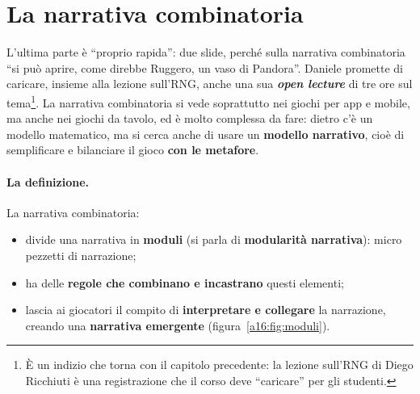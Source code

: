 \section{La narrativa combinatoria}
\label{a16:sec:combinatoria}



L'ultima parte è ``proprio rapida'': due slide, perché sulla narrativa combinatoria ``si può aprire,
come direbbe Ruggero, un vaso di Pandora''. Daniele promette di caricare, insieme alla lezione
sull'RNG, anche una sua \textbf{\emph{open lecture}} di tre ore sul tema\footnote{È un indizio che
torna con il capitolo precedente: la lezione sull'RNG di Diego Ricchiuti è una registrazione che il
corso deve ``caricare'' per gli studenti.}. La narrativa combinatoria si vede soprattutto nei giochi
per app e mobile, ma anche nei giochi da tavolo, ed è molto complessa da fare: dietro c'è un modello
matematico, ma si cerca anche di usare un \textbf{modello narrativo}, cioè di semplificare e
bilanciare il gioco \textbf{con le metafore}.

\paragraph{La definizione.} La narrativa combinatoria:
\begin{itemize}
  \item divide una narrativa in \textbf{moduli} (si parla di \textbf{modularità narrativa}): micro
        pezzetti di narrazione;
  \item ha delle \textbf{regole che combinano e incastrano} questi elementi;
  \item lascia ai giocatori il compito di \textbf{interpretare e collegare} la narrazione, creando una
        \textbf{narrativa emergente} (figura~\ref{a16:fig:moduli}).
\end{itemize}

